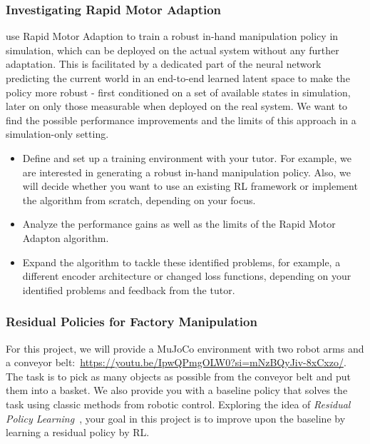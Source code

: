 \documentclass[a4paper]{article}
\begin{document}
\subsubsection{Investigating Rapid Motor Adaption}
\citet{qi2022inhand} use Rapid Motor Adaption to train a robust in-hand manipulation policy in simulation, which can be deployed on the actual system without any further adaptation.
This is facilitated by a dedicated part of the neural network predicting the current world in an end-to-end learned latent space to make the policy more robust - first conditioned on a set of available states in simulation, later on only those measurable when deployed on the real system.
We want to find the possible performance improvements and the limits of this approach in a simulation-only setting.
\begin{itemize}
  \item Define and set up a training environment with your tutor.
  For example, we are interested in generating a robust in-hand manipulation policy.
  Also, we will decide whether you want to use an existing RL framework or implement the algorithm from scratch, depending on your focus.
  \item Analyze the performance gains as well as the limits of the Rapid Motor Adapton algorithm.
  \item Expand the algorithm to tackle these identified problems, for example, a different encoder architecture or changed loss functions, depending on your identified problems and feedback from the tutor.
\end{itemize}


\subsubsection{Residual Policies for Factory Manipulation}

For this project, we will provide a MuJoCo environment with two robot arms and a conveyor belt:~\url{https://youtu.be/IpwQPmgOLW0?si=mNzBQyJiv-8xCxzo/}.
The task is to pick as many objects as possible from the conveyor belt and put them into a basket. 
We also provide you with a baseline policy that solves the task using classic methods from robotic control.
Exploring the idea of \textit{Residual Policy Learning}~\cite{Silver2018-kz}, your goal in this project is to improve upon the baseline by learning a residual policy by RL.
\end{document}
